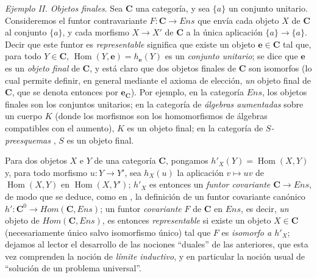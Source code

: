 \begin{env}[8.1.10]
\label{0.8.1.10}
\label{0.8.1.10-fr}
\textit{Ejemplo II. Objetos finales}.
Sea $\boldsymbol{C}$ una categoría, y sea $\{a\}$ un conjunto unitario.
Consideremos el funtor contravariante $F:\boldsymbol{C}\to\boldsymbol{\mathit{Ens}}$ que envía cada objeto $X$ de $\boldsymbol{C}$ al conjunto $\{a\}$, y cada morfismo $X\to X'$ de $\boldsymbol{C}$ a la única aplicación $\{a\}\to\{a\}$.
Decir que este funtor es \emph{representable} significa que existe un objeto $\boldsymbol{e}\in\boldsymbol{C}$ tal que, para todo $Y\in\boldsymbol{C}$, $\operatorname{Hom}(Y,\boldsymbol{e})=h_{\mathbf{e}}(Y)$ es un \emph{conjunto unitario}; se dice que $\boldsymbol{e}$ es un \emph{objeto final} de $\boldsymbol{C}$, y está claro que dos objetos finales de $\boldsymbol{C}$ son isomorfos (lo cual permite definir, en general mediante el axioma de elección, \emph{un} objeto final de $\boldsymbol{C}$, que se denota entonces por $\boldsymbol{e}_{\mathbf{C}}$).
Por ejemplo, en la categoría $\boldsymbol{\mathit{Ens}}$, los objetos finales son los conjuntos unitarios; en la categoría de \emph{álgebras aumentadas} sobre un cuerpo $K$ (donde los morfismos son los homomorfismos de álgebras compatibles con el aumento), $K$ es un objeto final; en la categoría de \emph{$S$-preesquemas} , $S$ es un objeto final.
\end{env}

\begin{env}[8.1.11]
\label{0.8.1.11}
\label{0.8.1.11-fr}
Para dos objetos $X$ e $Y$ de una categoría $\boldsymbol{C}$, pongamos $h'_X(Y)=\operatorname{Hom}(X,Y)$ y, para todo morfismo $u:Y\to Y'$, sea $h_X(u)$ la aplicación $v\mapsto uv$ de $\operatorname{Hom}(X,Y)$ en $\operatorname{Hom}(X,Y')$; $h'_X$ es entonces un \emph{funtor covariante $\boldsymbol{C}\to\boldsymbol{\mathit{Ens}}$}, de modo que se deduce, como en , la definición de un funtor covariante canónico $h':\boldsymbol{C}^0\to\boldsymbol{\mathit{Hom}}(\boldsymbol{C},\boldsymbol{\mathit{Ens}})$; un funtor \emph{covariante} $F$ de $\boldsymbol{C}$ en $\boldsymbol{\mathit{Ens}}$, es decir, \emph{un} objeto de $\boldsymbol{\mathit{Hom}}(\boldsymbol{C},\boldsymbol{\mathit{Ens}})$, es entonces \emph{representable} si existe un objeto $X\in\boldsymbol{C}$ (necesariamente único salvo isomorfismo único) tal que $F$ es \emph{isomorfo a $h'_X$}; dejamos al lector el desarrollo de las nociones ``duales'' de las anteriores, que esta vez comprenden la noción de \emph{límite inductivo}, y en particular la noción usual de ``solución de un problema universal''.
\end{env}

